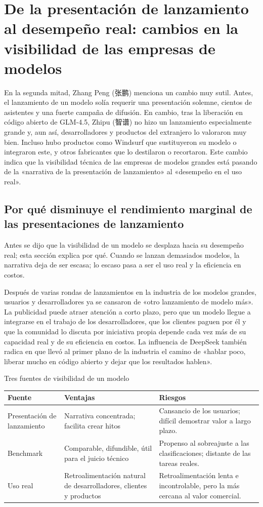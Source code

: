\section{De la presentación de lanzamiento al desempeño real: cambios en la visibilidad de las empresas de modelos}

En la segunda mitad, Zhang Peng (张鹏) menciona un cambio muy sutil. Antes, el lanzamiento de un modelo solía requerir una presentación solemne, cientos de asistentes y una fuerte campaña de difusión. En cambio, tras la liberación en código abierto de GLM-4.5, Zhipu (智谱) no hizo un lanzamiento especialmente grande y, aun así, desarrolladores y productos del extranjero lo valoraron muy bien. Incluso hubo productos como Windsurf que sustituyeron su modelo o integraron este, y otros fabricantes que lo destilaron o recortaron. Este cambio indica que la visibilidad técnica de las empresas de modelos grandes está pasando de la «narrativa de la presentación de lanzamiento» al «desempeño en el uso real».

\subsection{Por qué disminuye el rendimiento marginal de las presentaciones de lanzamiento}

Antes se dijo que la visibilidad de un modelo se desplaza hacia su desempeño real; esta sección explica por qué. Cuando se lanzan demasiados modelos, la narrativa deja de ser escasa; lo escaso pasa a ser el uso real y la eficiencia en costos.

Después de varias rondas de lanzamientos en la industria de los modelos grandes, usuarios y desarrolladores ya se cansaron de «otro lanzamiento de modelo más». La publicidad puede atraer atención a corto plazo, pero que un modelo llegue a integrarse en el trabajo de los desarrolladores, que los clientes paguen por él y que la comunidad lo discuta por iniciativa propia depende cada vez más de su capacidad real y de su eficiencia en costos. La influencia de DeepSeek también radica en que llevó al primer plano de la industria el camino de «hablar poco, liberar mucho en código abierto y dejar que los resultados hablen».

\begin{knowledgebox}{Tres fuentes de visibilidad de un modelo}
\begin{tabularx}{\textwidth}{p{}p{}X}
\toprule
Fuente & Ventajas & Riesgos \\
\midrule
Presentación de lanzamiento & Narrativa concentrada; facilita crear hitos & Cansancio de los usuarios; difícil demostrar valor a largo plazo. \\
Benchmark & Comparable, difundible, útil para el juicio técnico & Propenso al sobreajuste a las clasificaciones; distante de las tareas reales. \\
Uso real & Retroalimentación natural de desarrolladores, clientes y productos & Retroalimentación lenta e incontrolable, pero la más cercana al valor comercial. \\
\bottomrule
\end{tabularx}
\end{knowledgebox}

